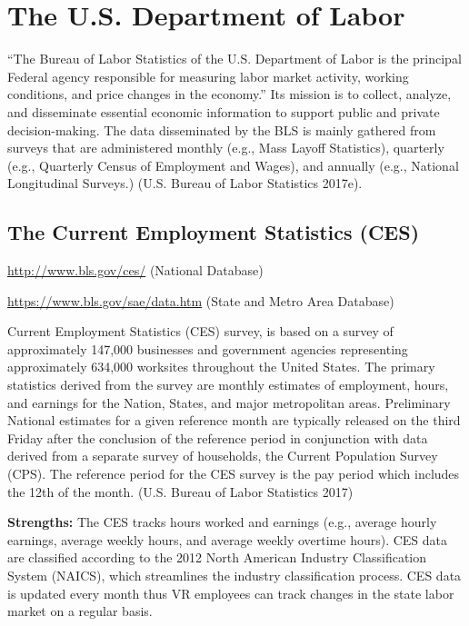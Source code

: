 \documentclass[]{book}
\theoremstyle{definition}
\theoremstyle{definition}
\theoremstyle{definition}
\theoremstyle{remark}
\begin{document}
\section{The U.S. Department of
Labor}\label{the-u.s.-department-of-labor}

``The Bureau of Labor Statistics of the U.S. Department of Labor is the
principal Federal agency responsible for measuring labor market
activity, working conditions, and price changes in the economy.'' Its
mission is to collect, analyze, and disseminate essential economic
information to support public and private decision-making. The data
disseminated by the BLS is mainly gathered from surveys that are
administered monthly (e.g., Mass Layoff Statistics), quarterly (e.g.,
Quarterly Census of Employment and Wages), and annually (e.g., National
Longitudinal Surveys.) (U.S. Bureau of Labor Statistics 2017e).

\subsection{The Current Employment Statistics
(CES)}\label{the-current-employment-statistics-ces}

\url{http://www.bls.gov/ces/} (National Database)

\url{https://www.bls.gov/sae/data.htm} (State and Metro Area Database)

Current Employment Statistics (CES) survey, is based on a survey of
approximately 147,000 businesses and government agencies representing
approximately 634,000 worksites throughout the United States. The
primary statistics derived from the survey are monthly estimates of
employment, hours, and earnings for the Nation, States, and major
metropolitan areas. Preliminary National estimates for a given reference
month are typically released on the third Friday after the conclusion of
the reference period in conjunction with data derived from a separate
survey of households, the Current Population Survey (CPS). The reference
period for the CES survey is the pay period which includes the 12th of
the month. (U.S. Bureau of Labor Statistics 2017)

\textbf{Strengths:} The CES tracks hours worked and earnings (e.g.,
average hourly earnings, average weekly hours, and average weekly
overtime hours). CES data are classified according to the 2012 North
American Industry Classification System (NAICS), which streamlines the
industry classification process. CES data is updated every month thus VR
employees can track changes in the state labor market on a regular
basis.
\end{document}
